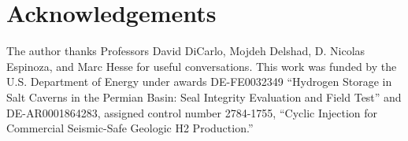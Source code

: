 \documentclass[11pt]{article}
\begin{document}









\appendix
{}




\section*{Acknowledgements}

The author thanks Professors David DiCarlo, Mojdeh Delshad, D. Nicolas Espinoza, and Marc Hesse
for useful conversations. This work was funded by the U.S. Department of Energy
under awards DE-FE0032349 ``Hydrogen Storage in Salt Caverns in the Permian
Basin: Seal Integrity Evaluation and Field Test'' and DE-AR0001864283, assigned
control number 2784-1755, ``Cyclic Injection for Commercial Seismic-Safe
Geologic H2 Production.''





\end{document}
